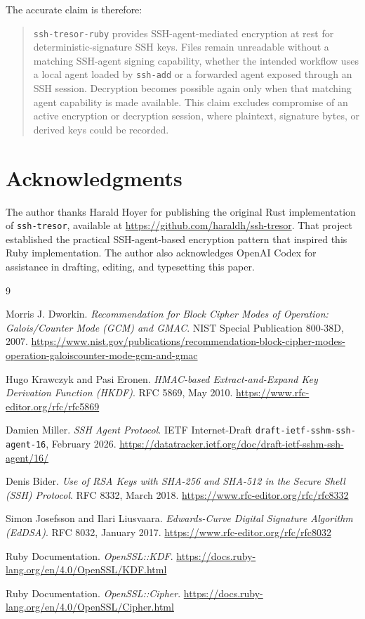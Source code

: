 \documentclass[11pt]{article}
\theoremstyle{definition}
\theoremstyle{plain}
\newcommand{\Project}{\texttt{ssh-tresor-ruby}}
\begin{document}
The accurate claim is therefore:

\begin{quote}
\Project{} provides SSH-agent-mediated encryption at rest for deterministic-signature SSH keys. Files remain unreadable without a matching SSH-agent signing capability, whether the intended workflow uses a local agent loaded by \texttt{ssh-add} or a forwarded agent exposed through an SSH session. Decryption becomes possible again only when that matching agent capability is made available. This claim excludes compromise of an active encryption or decryption session, where plaintext, signature bytes, or derived keys could be recorded.
\end{quote}

\section*{Acknowledgments}

The author thanks Harald Hoyer for publishing the original Rust implementation of \texttt{ssh-tresor}, available at \url{https://github.com/haraldh/ssh-tresor}. That project established the practical SSH-agent-based encryption pattern that inspired this Ruby implementation. The author also acknowledges OpenAI Codex for assistance in drafting, editing, and typesetting this paper.

\begin{thebibliography}{9}

Morris J. Dworkin.
\newblock \emph{Recommendation for Block Cipher Modes of Operation: Galois/Counter Mode (GCM) and GMAC}.
\newblock NIST Special Publication 800-38D, 2007.
\newblock \url{https://www.nist.gov/publications/recommendation-block-cipher-modes-operation-galoiscounter-mode-gcm-and-gmac}

Hugo Krawczyk and Pasi Eronen.
\newblock \emph{HMAC-based Extract-and-Expand Key Derivation Function (HKDF)}.
\newblock RFC 5869, May 2010.
\newblock \url{https://www.rfc-editor.org/rfc/rfc5869}

Damien Miller.
\newblock \emph{SSH Agent Protocol}.
\newblock IETF Internet-Draft \texttt{draft-ietf-sshm-ssh-agent-16}, February 2026.
\newblock \url{https://datatracker.ietf.org/doc/draft-ietf-sshm-ssh-agent/16/}

Denis Bider.
\newblock \emph{Use of RSA Keys with SHA-256 and SHA-512 in the Secure Shell (SSH) Protocol}.
\newblock RFC 8332, March 2018.
\newblock \url{https://www.rfc-editor.org/rfc/rfc8332}

Simon Josefsson and Ilari Liusvaara.
\newblock \emph{Edwards-Curve Digital Signature Algorithm (EdDSA)}.
\newblock RFC 8032, January 2017.
\newblock \url{https://www.rfc-editor.org/rfc/rfc8032}

Ruby Documentation.
\newblock \emph{OpenSSL::KDF}.
\newblock \url{https://docs.ruby-lang.org/en/4.0/OpenSSL/KDF.html}

Ruby Documentation.
\newblock \emph{OpenSSL::Cipher}.
\newblock \url{https://docs.ruby-lang.org/en/4.0/OpenSSL/Cipher.html}

\end{thebibliography}
\end{document}
